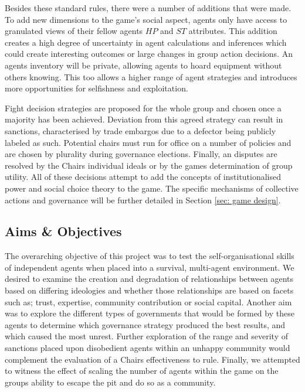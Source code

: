 Besides these standard rules, there were a number of additions that were made. To add new dimensions to the game's social aspect, agents only have access to granulated views of their fellow agents $HP$ and $ST$ attributes. This addition creates a high degree of uncertainty in agent calculations and inferences which could create interesting outcomes or large changes in group action decisions. An agents inventory will be private, allowing agents to hoard equipment without others knowing. This too allows a higher range of agent strategies and introduces more opportunities for selfishness and exploitation. 

Fight decision strategies are proposed for the whole group and chosen once a majority has been achieved. Deviation from this agreed strategy can result in sanctions, characterised by trade embargos due to a defector being publicly labeled as such. Potential chairs must run for office on a number of policies and are chosen by plurality during governance elections. Finally, an disputes are resolved by the Chairs individual ideals or by the games determination of group utility. All of these decisions attempt to add the concepts of institutionalised power and social choice theory to the game. The specific mechanisms of collective actions and governance will be further detailed in Section \ref{sec: game design}. 


\subsection{Aims \& Objectives}\label{sec:aims}

The overarching objective of this project was to test the self-organisational skills of independent agents when placed into a survival, multi-agent environment. We desired to examine the creation and degradation of relationships between agents based on differing ideologies and whether those relationships are based on facets such as; trust, expertise, community contribution or social capital. Another aim was to explore the different types of governments that would be formed by these agents to determine which governance strategy produced the best results, and which caused the most unrest. Further exploration of the range and severity of sanctions placed upon disobedient agents within an unhappy community would complement the evaluation of a Chairs effectiveness to rule. Finally, we attempted to witness the effect of scaling the number of agents within the game on the groups ability to escape the pit and do so as a community. 

